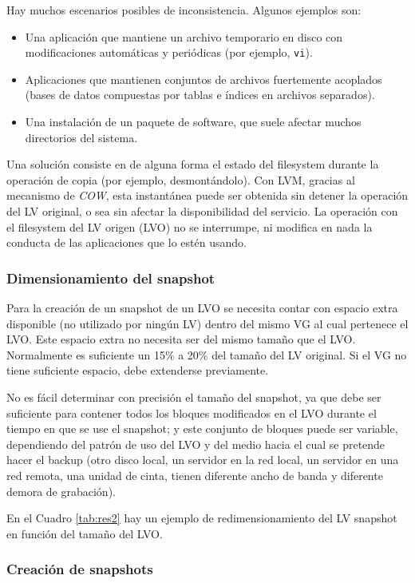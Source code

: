 Hay muchos escenarios posibles de inconsistencia. Algunos ejemplos son:
\begin{itemize}
	\item Una aplicación que mantiene un archivo temporario en disco con modificaciones automáticas y periódicas (por ejemplo, \lstinline$vi$). 
	\item Aplicaciones que mantienen conjuntos de archivos fuertemente acoplados (bases de datos compuestas por tablas e índices en archivos separados).
	\item Una instalación de un paquete de software, que suele afectar muchos directorios del sistema. 
\end{itemize}

Una solución consiste en  de alguna forma el estado del filesystem durante la operación de copia (por ejemplo, desmontándolo). Con LVM, gracias al mecanismo de \emph{COW}, esta instantánea puede ser obtenida sin detener la operación del LV original, o sea sin afectar la disponibilidad del servicio. La operación con el filesystem del LV origen (LVO) no se interrumpe, ni modifica en nada la conducta de las aplicaciones que lo estén usando. 

\subsubsection {Dimensionamiento del snapshot}

Para la creación de un snapshot de un LVO se necesita contar con espacio extra disponible (no utilizado por ningún LV) dentro del mismo VG al cual pertenece el LVO. Este espacio extra no necesita ser del mismo tamaño que el LVO. Normalmente es suficiente un 15\% a 20\% del tamaño del LV original. Si el VG no tiene suficiente espacio, debe extenderse previamente.

No es fácil determinar con precisión el tamaño del snapshot, ya que debe ser suficiente para contener todos los bloques modificados en el LVO durante el tiempo en que se use el snapshot; y este conjunto de bloques puede ser variable, dependiendo del patrón de uso del LVO y del medio hacia el cual se pretende hacer el backup (otro disco local, un servidor en la red local, un servidor en una red remota, una unidad de cinta, tienen diferente ancho de banda y diferente demora de grabación).

En el Cuadro \ref{tab:res2} hay un ejemplo de redimensionamiento del LV snapshot en función del tamaño del LVO.

\subsubsection{Creación de snapshots}
\label{ssub:snapcreate}

